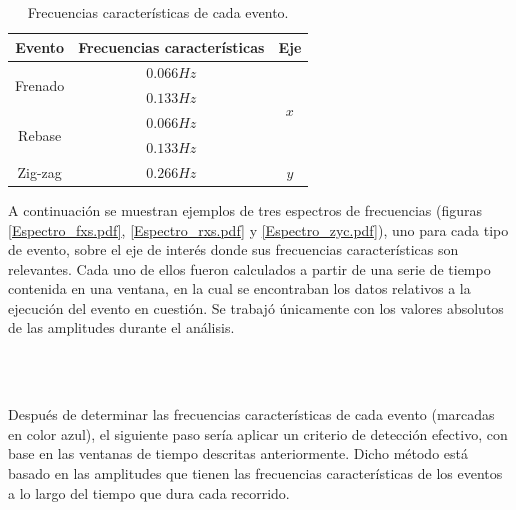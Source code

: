 \begin{table}[H]
\centering
\begin{tabular}{c|c|c}
\hline \hline
\bf Evento &\bf Frecuencias características & \bf Eje \\ 
\hline \hline
\multirow{2}{*}{Frenado} & $0.066Hz$ & \multirow{4}{*}{$x$} \\ \cline{2-2}
& $0.133Hz$ & \\ \cline{1-2}
\multirow{2}{*}{Rebase} & $0.066Hz$ & \\ \cline{2-2}
& $0.133Hz$ & \\ \hline
Zig-zag & $0.266Hz$ & $y$\\
\hline \hline
\end{tabular}
\caption{Frecuencias características de cada evento.}
\label{tablasfrec}
\end{table}

A continuación se muestran ejemplos de tres espectros de frecuencias (figuras \ref{Espectro_fxs.pdf}, \ref{Espectro_rxs.pdf} y \ref{Espectro_zyc.pdf}), uno para cada tipo de evento, sobre el eje de interés donde sus frecuencias características son relevantes. 
Cada uno de ellos fueron calculados a partir de una serie de tiempo contenida en una ventana, en la cual se encontraban los datos relativos a la ejecución del evento en cuestión. Se trabajó únicamente con los valores absolutos de las amplitudes durante el análisis.

\pagebreak
\ \\
\vspace{27cm}
\pagebreak
\ \\
\vspace{10.4cm}

Después de determinar las frecuencias características de cada evento (marcadas en color azul), el siguiente paso sería aplicar un criterio de detección efectivo, con base en las ventanas de tiempo descritas anteriormente. 
Dicho método está basado en las amplitudes que tienen las frecuencias características de los eventos a lo largo del tiempo que dura cada recorrido.

